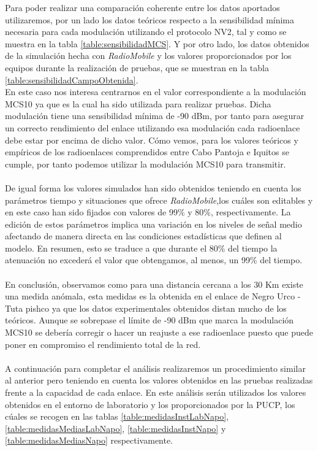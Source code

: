 Para poder realizar una comparación coherente entre los datos aportados utilizaremos, por un lado los datos teóricos respecto a la sensibilidad mínima necesaria para cada modulación utilizando el protocolo NV2, tal y como se muestra en la tabla \ref{table:sensibilidadMCS}. Y por otro lado, los datos obtenidos de la simulación hecha con \textit{RadioMobile} y los valores proporcionados por los equipos durante la realización de pruebas, que se muestran en la tabla \ref{table:sensibilidadCampoObtenida}.\\
En este caso nos interesa centrarnos en el valor correspondiente a la modulación MCS10 ya que es la cual ha sido utilizada para realizar pruebas. Dicha modulación tiene una sensibilidad mínima de -90 dBm, por tanto para asegurar un correcto rendimiento del enlace utilizando esa modulación cada radioenlace debe estar por encima de dicho valor. Cómo vemos, para los valores teóricos y empíricos de los radioenlaces comprendidos entre Cabo Pantoja e Iquitos se cumple, por tanto podemos utilizar la modulación MCS10 para transmitir.\\\\

De igual forma los valores simulados han sido obtenidos teniendo en cuenta los parámetros tiempo y situaciones que ofrece \textit{RadioMobile},los cuáles son editables y en este caso han sido fijados con valores de 99\% y 80\%, respectivamente. La edición de estos parámetros implica una variación en los niveles de señal medio afectando de manera directa en las condiciones estadísticas que definen al modelo. En resumen, esto se traduce a que durante el 80\% del tiempo la atenuación no excederá el valor que obtengamos, al menos, un 99\% del tiempo.\\\\

En conclusión, observamos como para una distancia cercana a los 30 Km existe una medida anómala, esta medidas es la obtenida en el enlace de Negro Urco - Tuta pishco ya que los datos experimentales obtenidos distan mucho de los teóricos. Aunque se sobrepase el límite de -90 dBm que marca la modulación MCS10 se debería corregir o hacer un reajuste a ese radioenlace puesto que puede poner en compromiso el rendimiento total de la red.\\\\

A continuación para completar el análisis realizaremos un procedimiento similar al anterior pero teniendo en cuenta los valores obtenidos en las pruebas realizadas frente a la capacidad de cada enlace. En este análisis serán utilizados los valores obtenidos en el entorno de laboratorio y los proporcionados por la PUCP, los cúales se recogen en las tablas \ref{table:medidasInstLabNapo}, \ref{table:medidasMediasLabNapo}, \ref{table:medidasInstNapo} y \ref{table:medidasMediasNapo} respectivamente. \\\\

